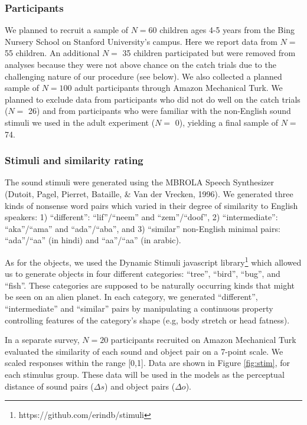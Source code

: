 \documentclass[10pt, letterpaper]{article}
\begin{document}
\subsubsection{Participants}\label{participants}

We planned to recruit a sample of \(N=60\) children ages 4-5 years from
the Bing Nursery School on Stanford University's campus. Here we report
data from \(N=\) 55 children. An additional \(N=\) 35 children
participated but were removed from analyses because they were not above
chance on the catch trials due to the challenging nature of our
procedure (see below). We also collected a planned sample of \(N=100\)
adult participants through Amazon Mechanical Turk. We planned to exclude
data from participants who did not do well on the catch trials (\(N=\)
26) and from participants who were familiar with the non-English sound
stimuli we used in the adult experiment (\(N=\) 0), yielding a final
sample of \(N=\) 74.

\subsubsection{Stimuli and similarity
rating}\label{stimuli-and-similarity-rating}

The sound stimuli were generated using the MBROLA Speech Synthesizer
(Dutoit, Pagel, Pierret, Bataille, \& Van der Vrecken, 1996). We
generated three kinds of nonsense word pairs which varied in their
degree of similarity to English speakers: 1) ``different'':
``lif''/``neem'' and ``zem''/``doof'', 2) ``intermediate'':
``aka''/``ama'' and ``ada''/``aba'', and 3) ``similar'' non-English
minimal pairs: ``ada''/``aa'' (in hindi) and
``aa''/``a\textipa{\textcrh}a'' (in arabic).

As for the objects, we used the Dynamic Stimuli javascript
library\footnote{https://github.com/erindb/stimuli} which allowed us to
generate objects in four different categories: ``tree'', ``bird'',
``bug'', and ``fish''. These categories are supposed to be naturally
occurring kinds that might be seen on an alien planet. In each category,
we generated ``different'', ``intermediate'' and ``similar'' pairs by
manipulating a continuous property controlling features of the
category's shape (e.g, body stretch or head fatness).

In a separate survey, \(N=20\) participants recruited on Amazon
Mechanical Turk evaluated the similarity of each sound and object pair
on a 7-point scale. We scaled responses within the range {[}0,1{]}. Data
are shown in Figure \ref{fig:stim}, for each stimulus group. These data
will be used in the models as the perceptual distance of sound pairs
(\(\Delta s\)) and object pairs (\(\Delta o\)).
\end{document}
